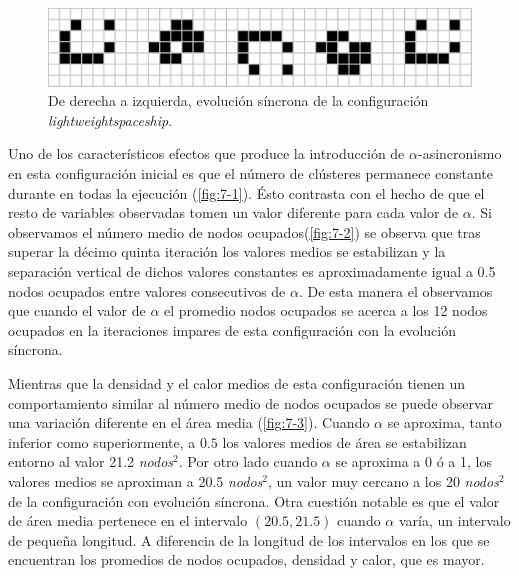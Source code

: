 \documentclass[../proyecto.tex]{memoir}
\begin{document}
\begin{figure}[H]
	\centering
    \includegraphics[width=\textwidth]{./images/lightweightspaceship_evo.png}
    \caption{De derecha a izquierda, evolución síncrona de la configuración \textit{lightweightspaceship}.}
    \label{fig:lightweightspaceship_evo}
\end{figure}

Uno de los característicos efectos que produce la introducción de $\alpha$-asincronismo en esta configuración inicial es que el número de clústeres permanece constante durante en todas la ejecución (\autoref{fig:7-1}). Ésto contrasta con el hecho de que el resto de variables observadas tomen un valor diferente para cada valor de $\alpha$. Si observamos el número medio de nodos ocupados(\autoref{fig:7-2}) se observa que tras superar la décimo quinta iteración los valores medios se estabilizan y la separación vertical de dichos valores constantes es aproximadamente igual a 0.5 nodos ocupados entre valores consecutivos de $\alpha$. De esta manera el observamos que cuando el valor de $\alpha$ el promedio nodos ocupados se acerca a los 12 nodos ocupados en la iteraciones impares de esta configuración con la evolución síncrona.

Mientras que la densidad y el calor medios de esta configuración tienen un comportamiento similar al número medio de nodos ocupados se puede observar una variación diferente en el área media (\autoref{fig:7-3}). Cuando $\alpha$ se aproxima, tanto inferior como superiormente, a $0.5$ los valores medios de área se estabilizan entorno al valor 21.2 \textit{nodos}$^2$. Por otro lado cuando $\alpha$ se aproxima a 0 ó a 1, los valores medios se aproximan a 20.5 \textit{nodos}$^2$, un valor muy cercano a los 20 \textit{nodos}$^2$ de la configuración con evolución síncrona. Otra cuestión notable es que el valor de área media pertenece en el intervalo $(20.5, 21.5)$ cuando $\alpha$ varía, un intervalo de pequeña longitud. A diferencia de la longitud de los intervalos en los que se encuentran los promedios de nodos ocupados, densidad y calor, que es mayor.
\end{document}

